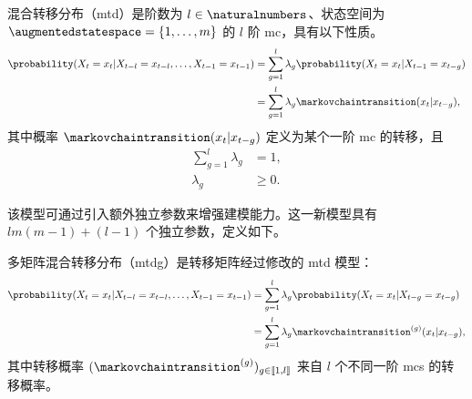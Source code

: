 \begin{defi}
\label{def:mixture_transition_distribution}
    混合转移分布（\gls{mtd}）是阶数为 $l\in\naturalnumbers$、状态空间为 $\augmentedstatespace=\{1,\dots,m\}$ 的 $l$ 阶 \gls{mc}，具有以下性质。
    \begin{align*}
        \probability(X_t = x_t\vert X_{t-l}=x_{t-l},\dots,X_{t-1}=x_{t-1})
        &= \sum_{g=1}^l \lambda_g \probability(X_t=x_t\vert X_{t-1}=x_{t-g})
        \\
        &= \sum_{g=1}^l \lambda_g \markovchaintransition(x_t\vert x_{t-g}),
    \end{align*}
    其中概率 $\markovchaintransition(x_t\vert x_{t-g})$ 定义为某个一阶 \gls{mc} 的转移，且
    \begin{align*}
        \sum_{g=1}^l \lambda_g &=1,
        \\
        \lambda_g &\ge 0.
    \end{align*}
\end{defi}

该模型可通过引入额外独立参数来增强建模能力。这一新模型具有 $lm(m-1) + (l-1)$ 个独立参数，定义如下。

\begin{defi}
\label{def:multimatrix_mixture_transistion_distribution}
    多矩阵混合转移分布（\gls{mtdg}）是转移矩阵经过修改的 \gls{mtd} 模型：
    \begin{align*}
        \probability(X_t = x_t\vert X_{t-l}=x_{t-l},\dots,X_{t-1}=x_{t-1})
        &= \sum_{g=1}^l \lambda_g \probability(X_t=x_t\vert X_{t-g}=x_{t-g})
        \\
        &= \sum_{g=1}^l \lambda_g \markovchaintransition^{(g)}(x_t\vert x_{t-g}),
    \end{align*}
    其中转移概率 $(\markovchaintransition^{(g)})_{g\in[\![1,l]\!]}$ 来自 $l$ 个不同一阶 \glspl{mc} 的转移概率。
\end{defi}

